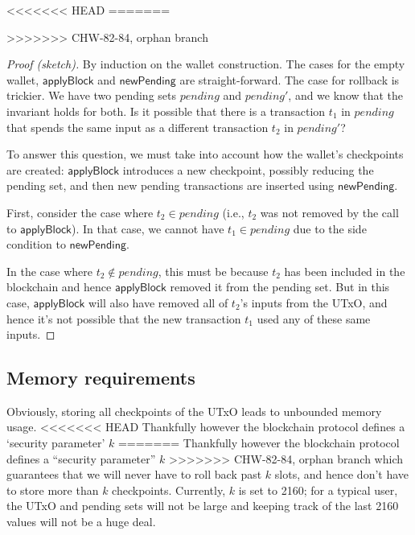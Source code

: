 \documentclass{article}
\theoremstyle{definition}{
  \newtheorem{lemma}{Lemma}[section] %
  \newtheorem{definition}[lemma]{Definition}
}
\theoremstyle{theorem}{
  \newtheorem{invariant}[lemma]{Invariant}
  \newtheorem{proofobligation}[lemma]{Proof Obligation}
}
\numberwithin{equation}{lemma}
\begin{document}
<<<<<<< HEAD
=======


>>>>>>> CHW-82-84, orphan branch
\begin{proof}[Proof (sketch)]
By induction on the wallet construction. The cases for the empty wallet,
$\mathsf{applyBlock}$ and $\mathsf{newPending}$ are straight-forward.
The case for rollback is trickier. We have two pending sets
$\mathit{pending}$ and $\mathit{pending'}$, and we know that the invariant
holds for both. Is it possible that there is a transaction $t_1$ in $\mathit{pending}$
that spends the same input as a different transaction $t_2$ in $\mathit{pending}'$?

To answer this question, we must take into account how the wallet's checkpoints
are created: $\mathsf{applyBlock}$ introduces a new checkpoint, possibly
reducing the pending set, and then new pending transactions are inserted using
$\mathsf{newPending}$.

First, consider the case where $t_2 \in \mathit{pending}$ (i.e., $t_2$ was not
removed by the call to $\mathsf{applyBlock}$). In that case, we cannot have $t_1
\in \mathit{pending}$ due to the side condition to $\mathsf{newPending}$.

In the case where $t_2 \notin \mathit{pending}$, this must be because $t_2$
has been included in the blockchain and hence $\mathsf{applyBlock}$ removed
it from the pending set. But in this case, $\mathsf{applyBlock}$ will also
have removed all of $t_2$'s inputs from the UTxO, and hence it's not possible
that the new transaction $t_1$ used any of these same inputs.
\end{proof}


\subsection{Memory requirements}

Obviously, storing all checkpoints of the UTxO leads to unbounded memory usage.
<<<<<<< HEAD
Thankfully however the blockchain protocol defines a `security parameter' $k$
=======
Thankfully however the blockchain protocol defines a ``security parameter'' $k$
>>>>>>> CHW-82-84, orphan branch
which guarantees that we will never have to roll back past $k$ slots, and hence
don't have to store more than $k$ checkpoints. Currently, $k$ is set to 2160;
for a typical user, the UTxO and pending sets will not be large and keeping
track of the last 2160 values will not be a huge deal.
\end{document}
